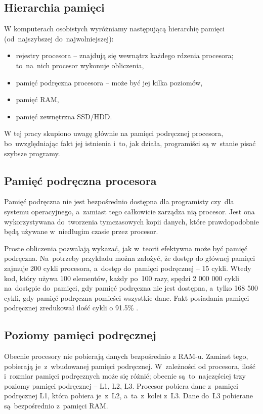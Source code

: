 \subsection{Hierarchia pamięci}

W komputerach osobistych wyróżniamy następującą hierarchię pamięci (od~najszybszej do~najwolniejszej):

\begin{itemize}
	\item rejestry procesora -- znajdują się wewnątrz każdego rdzenia procesora; to~na~nich procesor wykonuje obliczenia,
	\item pamięć podręczna procesora -- może być jej kilka poziomów,
	\item pamięć RAM,
	\item pamięć zewnętrzna SSD/HDD.
\end{itemize}

W tej pracy skupiono uwagę głównie na pamięci podręcznej procesora, bo~uwzględniając fakt jej istnienia i~to, jak działa, programiści są w~stanie pisać szybsze programy.

\subsection{Pamięć podręczna procesora}

Pamięć podręczna nie jest bezpośrednio dostępna dla programisty czy~dla systemu operacyjnego, a~zamiast tego całkowicie zarządza nią procesor. Jest ona wykorzystywana do~tworzenia tymczasowych kopii danych, które prawdopodobnie będą używane w~niedługim czasie przez procesor.

Proste obliczenia pozwalają wykazać, jak w~teorii efektywna może być pamięć podręczna.
Na~potrzeby przykładu można założyć, że dostęp do głównej pamięci zajmuje 200 cykli procesora, a~dostęp do~pamięci podręcznej -- 15 cykli. Wtedy kod, który używa 100 elementów, każdy po~100 razy, spędzi 2 000 000 cykli na~dostępie do~pamięci, gdy pamięć podręczna nie jest dostępna, a~tylko 168 500 cykli, gdy pamięć podręczna pomieści wszystkie dane. Fakt posiadania pamięci podręcznej zredukował ilość cykli o 91.5\% \cite{WhatEveryScientistShouldKnowAboutMemory}.

\subsection{Poziomy pamięci podręcznej}

Obecnie procesory nie pobierają danych bezpośrednio z RAM-u. Zamiast tego, pobierają je~z~wbudowanej pamięci podręcznej. W~zależności od procesora, ilość i~rozmiar pamięci podręcznych może się różnić; obecnie są~to~najczęściej trzy poziomy pamięci podręcznej -- L1, L2, L3. Procesor pobiera dane z~pamięci podręcznej L1, która pobiera je~z~L2, a~ta~z~kolei z~L3. Dane do~L3 pobierane są~bezpośrednio z~pamięci RAM.

